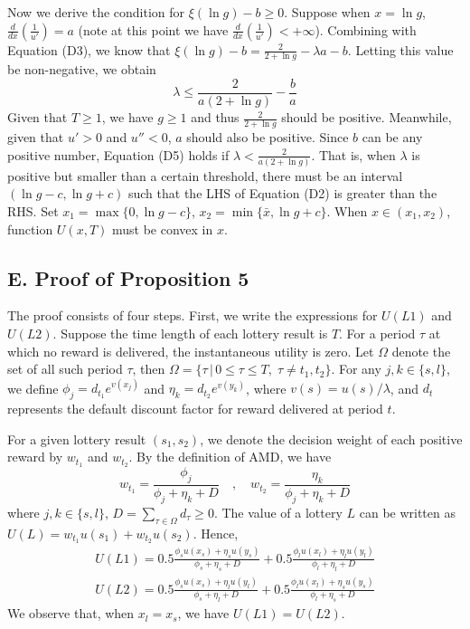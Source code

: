 Now we derive the condition for \(\xi(\ln g)-b\geq 0\). Suppose when
\(x=\ln g\), \(\frac{d}{dx}\left(\frac{1}{u'}\right)=a\) (note at this
point we have \(\frac{d}{dx}\left(\frac{1}{u'}\right)<+\infty\)).
Combining with Equation (D3), we know that
\(\xi(\ln g)-b =\frac{2}{2+\ln g}-\lambda a-b\). Letting this value be
non-negative, we obtain\[\tag{D5}
\lambda \leq \frac{2}{a(2+\ln g)}-\frac{b}{a}
\]Given that \(T\geq1\), we have \(g\geq 1\) and thus
\(\frac{2}{2+\ln g}\) should be positive. Meanwhile, given that \(u'>0\)
and \(u''<0\), \(a\) should also be positive. Since \(b\) can be any
positive number, Equation (D5) holds if
\(\lambda <\frac{2}{a(2+\ln g)}\). That is, when \(\lambda\) is positive
but smaller than a certain threshold, there must be an interval
\((\ln g-c,\ln g+c)\) such that the LHS of Equation (D2) is greater than
the RHS. Set \(x_1 = \max\{0,\ln g-c\}\),
\(x_2=\min\{\bar{x}, \ln g +c\}\). When \(x\in (x_1,x_2)\), function
\(U(x,T)\) must be convex in \(x\).

\hypertarget{e.-proof-of-proposition-5}{%
\subsection*{E. Proof of Proposition
5}\label{e.-proof-of-proposition-5}}

The proof consists of four steps. First, we write the expressions for
\(U(L1)\) and \(U(L2)\). Suppose the time length of each lottery result
is \(T\). For a period \(\tau\) at which no reward is delivered, the
instantaneous utility is zero. Let \(\Omega\) denote the set of all such
period \(\tau\), then
\(\Omega=\{\tau\,|\,0\leq\tau\leq T,\;\tau \neq t_1,t_2\}\). For any
\(j,k\in\{s,l\}\), we define \(\phi_j=d_{t_1}e^{v(x_j)}\) and
\(\eta_k=d_{t_2}e^{v(y_k)}\), where \(v(s)=u(s)/\lambda\), and \(d_t\)
represents the default discount factor for reward delivered at period
\(t\).

For a given lottery result \((s_1,s_2)\), we denote the decision weight
of each positive reward by \(w_{t_1}\) and \(w_{t_2}\). By the
definition of AMD, we have\[
w_{t_1} = \frac{\phi_j}{\phi_j + \eta_k +D} \quad ,\quad
w_{t_2} = \frac{\eta_k}{\phi_j + \eta_k +D}
\]where \(j,k\in\{s,l\}\), \(D=\sum_{\tau\in\Omega} d_{\tau}\geq 0\).
The value of a lottery \(L\) can be written as
\(U(L)=w_{t_1}u(s_1)+w_{t_2}u(s_2)\). Hence, \[\tag{E1}
\begin{aligned}
U(L1)=0.5\frac{\phi_s u(x_s)+\eta_s u(y_s)}{\phi_s+\eta_s+D} + 0.5\frac{\phi_l u(x_l)+\eta_l u(y_l)}{\phi_l+\eta_l+D} \\
U(L2)=0.5\frac{\phi_s u(x_s)+\eta_l u(y_l)}{\phi_s+\eta_l+D} + 0.5\frac{\phi_l u(x_l)+\eta_s u(y_s)}{\phi_l+\eta_s+D}
\end{aligned}
\]We observe that, when \(x_l=x_s\), we have \(U(L1)=U(L2)\).


